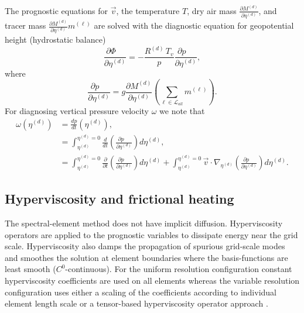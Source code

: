 \documentclass{agujournal}
\begin{document}
{The prognostic equations for $\vec{v}$, the temperature $T$, dry air mass ${\frac{\partial {M^{(d)}}}{\partial \eta^{(d)}}}$, and tracer mass ${\frac{\partial {M^{(d)}}}{\partial \eta^{(d)}}} m^{(\ell)}$ are solved with the diagnostic equation for geopotential height (hydrostatic balance)
\begin{equation}
\frac{\partial \Phi\quad }{\partial \eta^{(d)}}=-\frac{R^{(d)} \,T_v}{p}\frac{\partial p\quad }{\partial \eta^{(d)}},\label{eq:phi_1}
\end{equation}
where
\begin{equation}
\frac{\partial p\quad }{\partial \eta^{(d)}}=g\frac{\partial M^{(d)}}{\partial \eta^{(d)}}\left( \sum_{\ell \in \mathcal{L}_{all}} m^{(\ell)}\right).
\end{equation}
For diagnosing vertical pressure velocity $\omega$ we note that
\begin{align}
\omega(\eta^{(d)})&=\frac{dp}{dt}(\eta^{(d)}),\\
      &=\int_{\eta^{(d)}}^{\eta^{(d)}=0}\frac{d}{dt}\left( \frac{\partial p\quad }{\partial \eta^{(d)}}\right)d\eta^{(d)},\\
      &=\int_{\eta^{(d)}}^{\eta^{(d)}=0}\frac{\partial}{\partial t}\left( \frac{\partial p\quad }{\partial \eta^{(d)}}\right)d\eta^{(d)}+\int_{\eta^{(d)}}^{\eta^{(d)}=0} \vec{v}\cdot \nabla_{\eta^{(d)}} \left( \frac{\partial p\quad }{\partial \eta^{(d)}}\right)d\eta^{(d)}.\label{eq:omega}
\end{align}
%
\subsection{Hyperviscosity and frictional heating}\label{sec:hypvervisfric}
The spectral-element method does not have implicit diffusion. Hyperviscosity operators are applied to the prognostic variables to dissipate energy near the grid scale. Hyperviscosity also damps the propagation of spurious grid-scale modes \citep{AW2009SIAM} and smoothes the solution at element boundaries where the basis-functions are least smooth ($C^0$-continuous). For the uniform resolution configuration constant hyperviscosity coefficients are used on all elements whereas the variable resolution configuration uses either a scaling of the coefficients according to individual element length scale \citep{ZetAl2014JCb} or a tensor-based hyperviscosity operator approach \citep{GetAl2014GMD}.
}
\end{document}

